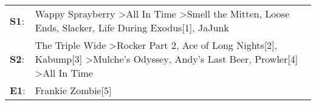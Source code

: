 \begin{supertabular}{p{0.03\textwidth}p{0.92\textwidth}}
 \textbf{S1}:  &                                                                   Wappy Sprayberry\textsuperscript{} \textgreater \enspace All In Time\textsuperscript{} \textgreater \enspace Smell the Mitten\textsuperscript{}, \enspace Loose Ends\textsuperscript{}, \enspace Slacker\textsuperscript{}, \enspace Life During Exodus[1]\textsuperscript{}, \enspace JaJunk\textsuperscript{}  \enspace  \\
 \textbf{S2}:  &  The Triple Wide\textsuperscript{} \textgreater \enspace Rocker Part 2\textsuperscript{}, \enspace Ace of Long Nights[2]\textsuperscript{}, \enspace Kabump[3]\textsuperscript{} \textgreater \enspace Mulche's Odyssey\textsuperscript{}, \enspace Andy's Last Beer\textsuperscript{}, \enspace Prowler[4]\textsuperscript{} \textgreater \enspace All In Time\textsuperscript{}  \enspace  \\
 \textbf{E1}:  &                                                                                                                                                                                                                                                                                                                                               Frankie Zombie[5]\textsuperscript{}  \enspace  \\
\end{supertabular}
